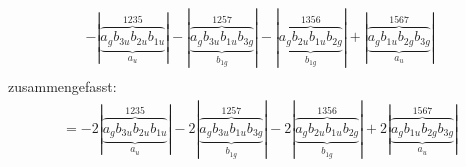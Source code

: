 \documentclass{article}
\begin{document}
\begin{multline*}
-\left|\underbrace{\overbrace{a_{g} b_{3u} b_{2u} b_{1u}}^{1 2 3 5}}_{a_{u}}\right|-\left|\underbrace{\overbrace{a_{g} b_{3u} b_{1u} b_{3g}}^{1 2 5 7}}_{b_{1g}}\right|-\left|\underbrace{\overbrace{a_{g} b_{2u} b_{1u} b_{2g}}^{1 3 5 6}}_{b_{1g}}\right|+\left|\underbrace{\overbrace{a_{g} b_{1u} b_{2g} b_{3g}}^{1 5 6 7}}_{a_{u}}\right|\\
\end{multline*}zusammengefasst:\begin{multline*}
=-2\left|\underbrace{\overbrace{a_{g} b_{3u} b_{2u} b_{1u}}^{1 2 3 5}}_{a_{u}}\right|-2\left|\underbrace{\overbrace{a_{g} b_{3u} b_{1u} b_{3g}}^{1 2 5 7}}_{b_{1g}}\right|-2\left|\underbrace{\overbrace{a_{g} b_{2u} b_{1u} b_{2g}}^{1 3 5 6}}_{b_{1g}}\right|+2\left|\underbrace{\overbrace{a_{g} b_{1u} b_{2g} b_{3g}}^{1 5 6 7}}_{a_{u}}\right|\\
\end{multline*}\\ \\
\vspace{0.5cm}
\end{document}
